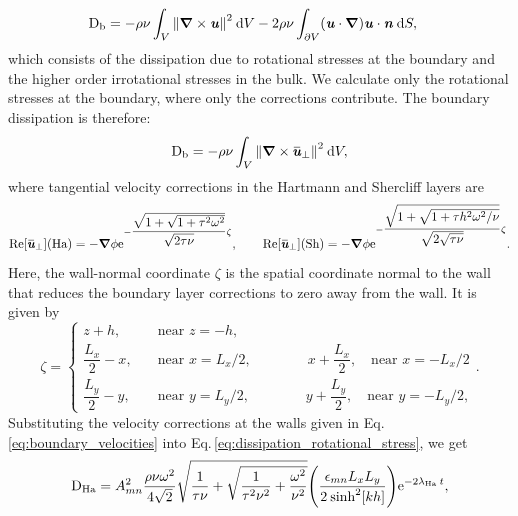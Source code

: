 \documentclass[aps,prfluids,reprint,superscriptaddress]{revtex4-2}
\newcommand{\h}[1]{\textbf{\textit{#1}}}
\newcommand{\ii}[1]{\text{#1}}
\newcommand{\overbar}[1]{\mkern 1.5mu\overline{\mkern-2mu#1\mkern-2mu}\mkern 1.5mu}
\numberwithin{equation}{section}
\begin{document}
\begin{align}
	\ii D_{\rm b} &= 
	- \rho\nu
	\int_{V} \norm{\bm\nabla \times \h u}^2  \: \mathrm dV
	-2  \rho\nu
	\int_{\partial V} 
	(\h u \cdot \bm\nabla )\h u \cdot \h n \:\mathrm dS,
\end{align}
which consists of the dissipation due to rotational stresses at the boundary and the higher order irrotational stresses in the bulk. We calculate only the rotational stresses at the boundary, where only the corrections contribute. The boundary dissipation is therefore:
\begin{equation}
	\ii D_{\rm b} = - \rho\nu
	\int_{V} \norm{\bm\nabla \times \overbar{\h u}_{\perp}}^2  \: \mathrm dV,
	\label{eq:dissipation_rotational_stress}
\end{equation}
where tangential velocity corrections in the Hartmann and Shercliff layers are
\begin{equation}
	\ii{Re}[{\overbar{\h u}}_{\perp}] (\ii{Ha})=
	-\bm\nabla \phi 
	\ii e^{-
		\dfrac{\sqrt{1 + \sqrt{1 + \tau^2\omega^2}}}{\sqrt{2\tau\nu}}
		\zeta
	},
	\qquad
	\ii{Re}[{\overbar{\h u}}_{\perp}] (\ii{Sh})=
	-\bm\nabla \phi
	\ii e^{-
		\dfrac{\sqrt{1 + \sqrt{1 + \tau h^2\omega^2/\nu}}}
		{\sqrt{2\sqrt{\tau\nu}}}
		\zeta
	}.
	\label{eq:boundary_velocities}
\end{equation}
Here, the wall-normal coordinate $\zeta$ is the spatial coordinate normal to the wall that reduces the boundary layer corrections to zero away from the wall. It is given by
\begin{equation}
	\zeta = \begin{cases}
		z + h, \quad &\text{near } z=-h, \\
		\dfrac{L_x}{2} - x, \quad &\text{near } x = L_x/2, \qquad\qquad
		x + \dfrac{L_x}{2}, \quad \text{near } x = -L_x/2 \\[5pt]
		\dfrac{L_y}{2} - y, \quad &\text{near } y = L_y/2, \qquad\qquad
		y + \dfrac{L_y}{2}, \quad \text{near } y = -L_y/2,
	\end{cases} .
\end{equation}
Substituting the velocity corrections at the walls given in Eq.\,\eqref{eq:boundary_velocities} into Eq.\,\eqref{eq:dissipation_rotational_stress}, we get
\begin{equation}
	\ii D_{\rm Ha} = A_{mn}^2
	\frac{\rho\nu\omega^2}{4\sqrt{2}}
	\sqrt{
		\dfrac{1}{\tau\nu} + 
		\sqrt{ \dfrac{1}{\tau^2\nu^2} + \dfrac{\omega^2}{\nu^2} } 
	}  
	\Biggl(
	\frac{\epsilon_{mn} L_xL_y}{2 \: \text{sinh}^2[kh]}
	\Biggr) \ii{e}^{-2\lambda_{\rm Ha}\: t},
\end{equation}
\end{document}

